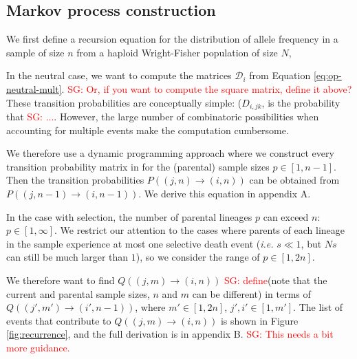 \documentclass[review]{elsarticle}
\newcommand{\ra}{\rightarrow}
\newcommand{\sgcomment}[1]{\textcolor{red}{SG: #1}}
\begin{document}
\subsection{Markov process construction}
\label{subsec:markov}

We first define a recursion equation for the distribution of allele frequency in a sample of size $n$ from a haploid Wright-Fisher population of size $N$, 


In the neutral case, we want to compute the matrices $\mathcal{D}_i$ from Equation \eqref{eq:op-neutral-mult}. \sgcomment{Or, if you want to compute the square matrix, define it above?}
These transition probabilities are conceptually simple: ($D_{i,jk}$, is the probability that \sgcomment{...}. However, the large number of combinatoric possibilities when accounting for multiple events make the computation cumbersome.  
 


We therefore use a dynamic programming approach where
we construct every transition probability matrix in for the (parental) sample sizes $p \in [1,n-1]$.
Then the transition probabilities $P((j,n)\ra(i,n))$ can be obtained from $P((j,n-1)\ra(i,n-1))$.
We derive this equation in appendix A.

In the case with selection, the number of parental lineages $p$ can exceed $n$: $p\in[1, \infty]$.
We restrict our attention to the cases where parents of each lineage in the sample experience at
most one selective death event (\textit{i.e.} $s \ll 1$, but $Ns$ can still be much larger than $1$), so we consider the range of $p \in [1, 2n]$.


We therefore want to find $Q((j,m)\ra(i,n))$ \sgcomment{define}(note that the current and parental sample sizes, $n$
and $m$ can be different) in terms of $Q((j',m')\ra(i',n-1))$, where $m' \in [1, 2n]$, $j',i' \in
[1, m']$. The list of events that contribute to $Q((j,m)\ra(i,n))$ is shown in Figure
\ref{fig:recurrence}, and the full derivation is in appendix B. \sgcomment{This needs a bit more guidance.}
\end{document}
